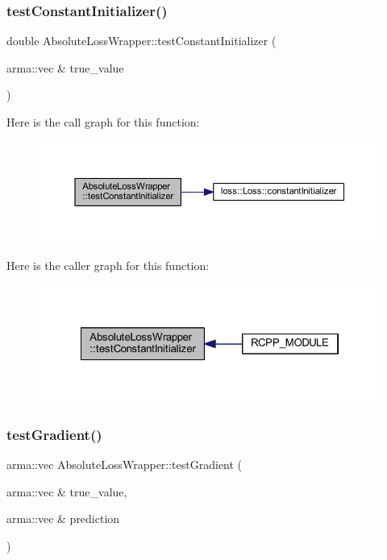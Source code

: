 \subsubsection{\texorpdfstring{test\+Constant\+Initializer()}{testConstantInitializer()}}
{\footnotesize\ttfamily double Absolute\+Loss\+Wrapper\+::test\+Constant\+Initializer (\begin{DoxyParamCaption}\item[{arma\+::vec \&}]{true\+\_\+value }\end{DoxyParamCaption})\hspace{0.3cm}{\ttfamily [inline]}}

Here is the call graph for this function\+:\nopagebreak
\begin{figure}[H]
\begin{center}
\leavevmode
\includegraphics[width=350pt]{class_absolute_loss_wrapper_ad90572ebb3a5bf84793f4bf1b42e56b9_cgraph}
\end{center}
\end{figure}
Here is the caller graph for this function\+:\nopagebreak
\begin{figure}[H]
\begin{center}
\leavevmode
\includegraphics[width=322pt]{class_absolute_loss_wrapper_ad90572ebb3a5bf84793f4bf1b42e56b9_icgraph}
\end{center}
\end{figure}
\mbox{\label{class_absolute_loss_wrapper_af64fe7b1882afacfc7cc408a79884861}} 
\subsubsection{\texorpdfstring{test\+Gradient()}{testGradient()}}
{\footnotesize\ttfamily arma\+::vec Absolute\+Loss\+Wrapper\+::test\+Gradient (\begin{DoxyParamCaption}\item[{arma\+::vec \&}]{true\+\_\+value,  }\item[{arma\+::vec \&}]{prediction }\end{DoxyParamCaption})\hspace{0.3cm}{\ttfamily [inline]}}

